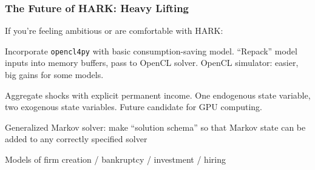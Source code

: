   \begin{frame}
    \frametitle{The Future of HARK: Heavy Lifting}
    If you're feeling ambitious or are comfortable with HARK:
    \bi
  \item <1->Incorporate \texttt{opencl4py} with basic consumption-saving model.  ``Repack'' model inputs into memory buffers, pass to OpenCL solver.  OpenCL simulator: easier, big gains for some models.

  \item <2->Aggregate shocks with explicit permanent income.  One endogenous state variable, two exogenous state variables.  Future candidate for GPU computing.

  \item <3->Generalized Markov solver: make ``solution schema'' so that Markov state can be added to any correctly specified solver

  \item <4->Models of firm creation / bankruptcy / investment / hiring
    \ei

    \hyperlink{DiscussionTopics}{}
  \end{frame}


